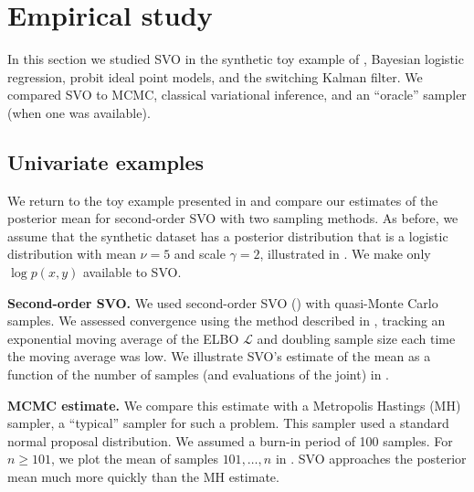 
\section{Empirical study}

In this section we studied SVO in the synthetic toy example of
, Bayesian logistic regression,
probit ideal point models, and the switching Kalman filter.  We
compared SVO to MCMC, classical variational inference, and an
``oracle'' sampler (when one was available).

\subsection{Univariate examples}
\label{sec:univariate_example}
We return to the toy example presented in
 and compare our estimates of
the posterior mean for second-order SVO with two sampling methods. As
before, we assume that the synthetic dataset has a posterior
distribution that is a logistic distribution with mean $\nu=5$ and
scale $\gamma=2$, illustrated in
. We make only
$\log p(x, y)$ available to SVO.

\textbf{Second-order SVO.}  We used second-order SVO
() with quasi-Monte Carlo samples.  We
assessed convergence using the method described in
, tracking an exponential
moving average of the ELBO $\mathcal{L}$ and doubling sample size each time
the moving average was low.  We illustrate SVO's estimate of the mean
as a function of the number of samples (and evaluations of the joint)
in .

\textbf{MCMC estimate.} We compare this estimate with a Metropolis
Hastings (MH) sampler, a ``typical'' sampler for such a problem.  This
sampler used a standard normal proposal distribution.  We assumed a
burn-in period of 100 samples.  For $n \ge 101$, we plot the mean of
samples $101, \ldots, n$ in .  SVO
approaches the posterior mean much more quickly than the MH estimate.

